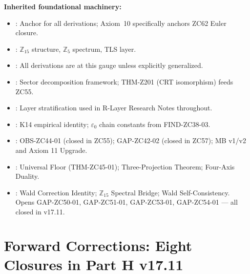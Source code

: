 \documentclass[12pt, a4paper]{article}
\begin{document}
\begin{inheritbox}[title={v17.11 Backward Inheritance Summary}]
\textbf{Inherited foundational machinery:}
\begin{itemize}[leftmargin=1.5em]
\item {}: Anchor
  for all derivations; Axiom~10 specifically anchors ZC62 Euler closure.
\item {}: $\mathbb{Z}_{15}$ structure, $\mathbb{Z}_{5}$
  spectrum, TLS layer.
\item {}: All derivations are at this gauge unless explicitly
  generalized.
\item {}: Sector
  decomposition framework; THM-Z201 (CRT isomorphism) feeds ZC55.
\item {}: Layer
  stratification used in R-Layer Research Notes throughout.
\item {}: K14 empirical
  identity; $\varepsilon_0$ chain constants from FIND-ZC38-03.
\item {}: OBS-ZC44-01
  (closed in ZC55); GAP-ZC42-02 (closed in ZC57); MB v1/v2 and
  Axiom 11 Upgrade.
\item {}: Universal
  Floor (THM-ZC45-01); Three-Projection Theorem; Four-Axis Duality.
\item {}: Wald
  Correction Identity; $\mathbb{Z}_{15}$ Spectral Bridge; Wald
  Self-Consistency. Opens GAP-ZC50-01, GAP-ZC51-01, GAP-ZC53-01,
  GAP-ZC54-01 --- all closed in v17.11.
\end{itemize}
\end{inheritbox}

\section{Forward Corrections: Eight Closures in Part H v17.11}
\label{sec:xlii-forward}
\end{document}
